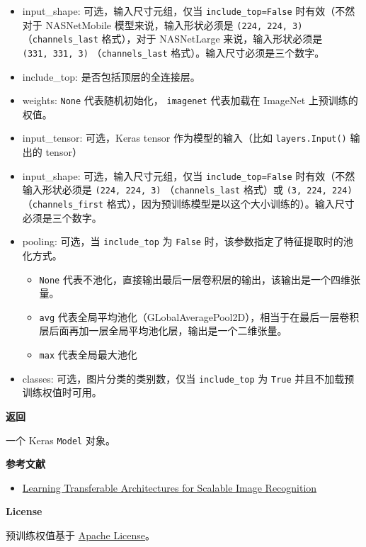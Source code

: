 \begin{itemize}
\tightlist
\item
  input\_shape: 可选，输入尺寸元组，仅当 \texttt{include\_top=False}
  时有效（不然对于 NASNetMobile 模型来说，输入形状必须是
  \texttt{(224,\ 224,\ 3)} （\texttt{channels\_last} 格式），对于
  NASNetLarge 来说，输入形状必须是 \texttt{(331,\ 331,\ 3)}
  （\texttt{channels\_last} 格式）。输入尺寸必须是三个数字。
\item
  include\_top: 是否包括顶层的全连接层。
\item
  weights: \texttt{None} 代表随机初始化，
  \texttt{\textquotesingle{}imagenet\textquotesingle{}} 代表加载在
  ImageNet 上预训练的权值。
\item
  input\_tensor: 可选，Keras tensor 作为模型的输入（比如
  \texttt{layers.Input()} 输出的 tensor）
\item
  input\_shape: 可选，输入尺寸元组，仅当 \texttt{include\_top=False}
  时有效（不然输入形状必须是 \texttt{(224,\ 224,\ 3)}
  （\texttt{channels\_last} 格式）或 \texttt{(3,\ 224,\ 224)}
  （\texttt{channels\_first}
  格式），因为预训练模型是以这个大小训练的）。输入尺寸必须是三个数字。
\item
  pooling: 可选，当 \texttt{include\_top} 为 \texttt{False}
  时，该参数指定了特征提取时的池化方式。

  \begin{itemize}
  \tightlist
  \item
    \texttt{None}
    代表不池化，直接输出最后一层卷积层的输出，该输出是一个四维张量。
  \item
    \texttt{\textquotesingle{}avg\textquotesingle{}}
    代表全局平均池化（GLobalAveragePool2D），相当于在最后一层卷积层后面再加一层全局平均池化层，输出是一个二维张量。
  \item
    \texttt{\textquotesingle{}max\textquotesingle{}} 代表全局最大池化
  \end{itemize}
\item
  classes: 可选，图片分类的类别数，仅当 \texttt{include\_top} 为
  \texttt{True} 并且不加载预训练权值时可用。
\end{itemize}

\textbf{返回}\label{ux8fd4ux56de-2}

一个 Keras \texttt{Model} 对象。

\textbf{参考文献}\label{ux53c2ux8003ux6587ux732e-8}

\begin{itemize}
\tightlist
\item
  \href{https://arxiv.org/abs/1707.07012}{Learning Transferable
  Architectures for Scalable Image Recognition}
\end{itemize}

\textbf{License}\label{license-7}

预训练权值基于
\href{https://github.com/tensorflow/models/blob/master/LICENSE}{Apache
License}。

\newpage
